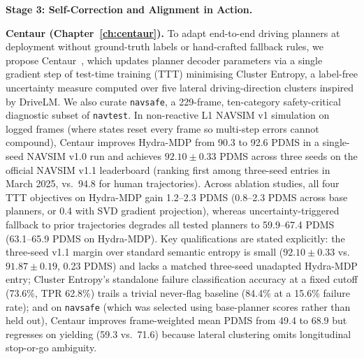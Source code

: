 \medskip
\noindent\textbf{Stage 3: Self-Correction and Alignment in Action.}

\noindent\textbf{Centaur (Chapter~\ref{ch:centaur}).}
To adapt end-to-end driving planners at deployment without ground-truth labels or hand-crafted fallback rules, we propose Centaur~\cite{sima2024centaur}, which updates planner decoder parameters via a single gradient step of test-time training (TTT) minimising Cluster Entropy, a label-free uncertainty measure computed over five lateral driving-direction clusters inspired by DriveLM. We also curate \texttt{navsafe}, a 229-frame, ten-category safety-critical diagnostic subset of \texttt{navtest}. In non-reactive L1 NAVSIM v1 simulation on logged frames (where states reset every frame so multi-step errors cannot compound), Centaur improves Hydra-MDP from 90.3 to 92.6 PDMS in a single-seed NAVSIM v1.0 run and achieves $92.10 \pm 0.33$ PDMS across three seeds on the official NAVSIM v1.1 leaderboard (ranking first among three-seed entries in March 2025, vs.\ 94.8 for human trajectories). Across ablation studies, all four TTT objectives on Hydra-MDP gain 1.2--2.3 PDMS (0.8--2.3 PDMS across base planners, or 0.4 with SVD gradient projection), whereas uncertainty-triggered fallback to prior trajectories degrades all tested planners to 59.9--67.4 PDMS (63.1--65.9 PDMS on Hydra-MDP). Key qualifications are stated explicitly: the three-seed v1.1 margin over standard semantic entropy is small ($92.10 \pm 0.33$ vs.\ $91.87 \pm 0.19$, 0.23 PDMS) and lacks a matched three-seed unadapted Hydra-MDP entry; Cluster Entropy's standalone failure classification accuracy at a fixed cutoff (73.6\%, TPR 62.8\%) trails a trivial never-flag baseline (84.4\% at a 15.6\% failure rate); and on \texttt{navsafe} (which was selected using base-planner scores rather than held out), Centaur improves frame-weighted mean PDMS from 49.4 to 68.9 but regresses on yielding (59.3 vs.\ 71.6) because lateral clustering omits longitudinal stop-or-go ambiguity.

